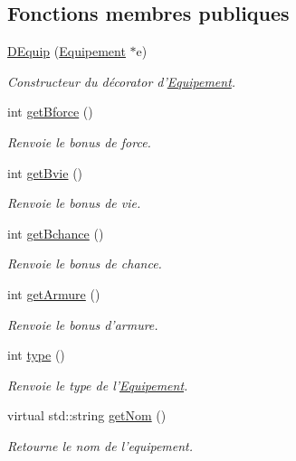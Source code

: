 \subsection*{Fonctions membres publiques}
\begin{DoxyCompactItemize}
\item 
\hypertarget{class_d_equip_a1e7c01de5a65a38e5699b6d4679e8422}{\hyperlink{class_d_equip_a1e7c01de5a65a38e5699b6d4679e8422}{D\-Equip} (\hyperlink{class_equipement}{Equipement} $\ast$e)}\label{class_d_equip_a1e7c01de5a65a38e5699b6d4679e8422}

\begin{DoxyCompactList}\small\item\em Constructeur du décorator d'\hyperlink{class_equipement}{Equipement}. \end{DoxyCompactList}\item 
int \hyperlink{class_d_equip_adb6645ce01c12a4cb3fe0b522ea6b25e}{get\-Bforce} ()
\begin{DoxyCompactList}\small\item\em Renvoie le bonus de force. \end{DoxyCompactList}\item 
int \hyperlink{class_d_equip_a085ea4ac21c238d8c147ff4e6d74794f}{get\-Bvie} ()
\begin{DoxyCompactList}\small\item\em Renvoie le bonus de vie. \end{DoxyCompactList}\item 
int \hyperlink{class_d_equip_a39407c92f0de87306a33f57fd22ce997}{get\-Bchance} ()
\begin{DoxyCompactList}\small\item\em Renvoie le bonus de chance. \end{DoxyCompactList}\item 
int \hyperlink{class_d_equip_a7b2c8227ae884c23ccc8f3a2e5702186}{get\-Armure} ()
\begin{DoxyCompactList}\small\item\em Renvoie le bonus d'armure. \end{DoxyCompactList}\item 
int \hyperlink{class_d_equip_a7c31f807517e5940e899780ac6d7a5c3}{type} ()
\begin{DoxyCompactList}\small\item\em Renvoie le type de l'\hyperlink{class_equipement}{Equipement}. \end{DoxyCompactList}\item 
virtual std\-::string \hyperlink{class_equipement_a0b0426a70bfce6e7c3efac605b75cd8e}{get\-Nom} ()
\begin{DoxyCompactList}\small\item\em Retourne le nom de l'equipement. \end{DoxyCompactList}\end{DoxyCompactItemize}
